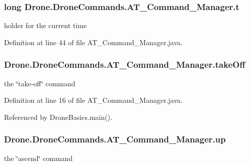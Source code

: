 \subsubsection[{t}]{\setlength{\rightskip}{0pt plus 5cm}long Drone.\+Drone\+Commands.\+A\+T\+\_\+\+Command\+\_\+\+Manager.\+t\hspace{0.3cm}{\ttfamily [private]}}\label{class_drone_1_1_drone_commands_1_1_a_t___command___manager_ae17b2729d7c785eebb2af3ada7069efe}
holder for the current time 

Definition at line 44 of file A\+T\+\_\+\+Command\+\_\+\+Manager.\+java.

\hypertarget{class_drone_1_1_drone_commands_1_1_a_t___command___manager_a43638f032e3994903cdabd2ca611448b}{}
\subsubsection[{take\+Off}]{ Drone.\+Drone\+Commands.\+A\+T\+\_\+\+Command\+\_\+\+Manager.\+take\+Off\hspace{0.3cm}{\ttfamily [private]}}\label{class_drone_1_1_drone_commands_1_1_a_t___command___manager_a43638f032e3994903cdabd2ca611448b}
the \char`\"{}take-\/off\char`\"{} command 

Definition at line 16 of file A\+T\+\_\+\+Command\+\_\+\+Manager.\+java.



Referenced by Drone\+Basics.\+main().

\hypertarget{class_drone_1_1_drone_commands_1_1_a_t___command___manager_a2a050072c86dfbd84ee82696b59d366e}{}
\subsubsection[{up}]{ Drone.\+Drone\+Commands.\+A\+T\+\_\+\+Command\+\_\+\+Manager.\+up\hspace{0.3cm}{\ttfamily [private]}}\label{class_drone_1_1_drone_commands_1_1_a_t___command___manager_a2a050072c86dfbd84ee82696b59d366e}
the \char`\"{}ascend\char`\"{} command 

